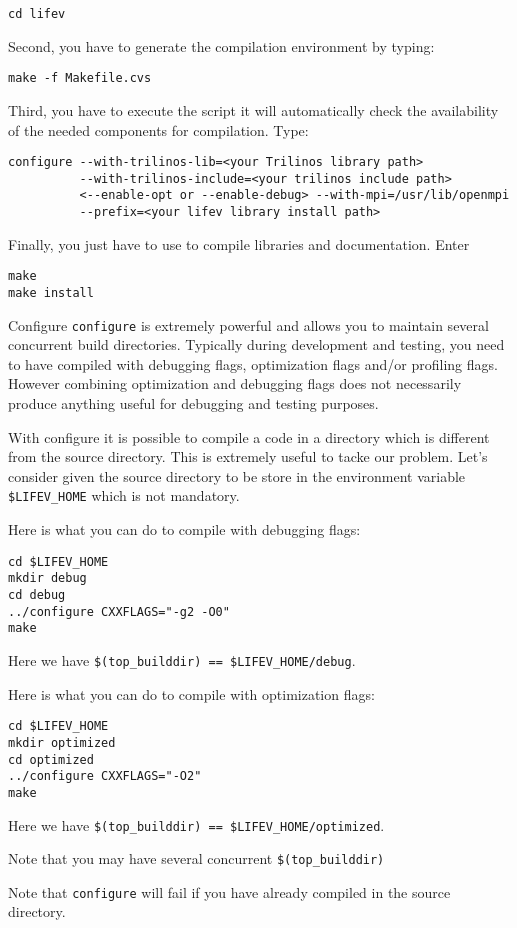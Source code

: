 \begin{verbatim}
cd lifev
\end{verbatim}

\noindent Second, you have to generate the compilation environment by typing:
\begin{verbatim}
make -f Makefile.cvs
\end{verbatim}

\noindent Third, you have to execute the script
it will automatically check the availability of the needed components
for \lifev compilation. Type:

\begin{verbatim}
configure --with-trilinos-lib=<your Trilinos library path>
          --with-trilinos-include=<your trilinos include path>
          <--enable-opt or --enable-debug> --with-mpi=/usr/lib/openmpi
          --prefix=<your lifev library install path>
\end{verbatim}

\noindent Finally, you just have to use  to compile \lifev libraries and documentation.
Enter
\begin{verbatim}
make
make install
\end{verbatim}

\begin{hint}{Configure}
  \label{hint:configure}
  \verb!configure! is extremely powerful and allows you to maintain
  several concurrent build directories. Typically during development
  and testing, you need to have \lifev compiled with debugging flags,
  optimization flags and/or profiling flags. However combining
  optimization and debugging flags does not necessarily produce
  anything useful for debugging and testing purposes.

  With configure it is possible to compile a code in a directory which
  is different from the source directory. This is extremely useful to
  tacke our problem. Let's consider given the source directory to be
  store in the environment variable \verb!$LIFEV_HOME! which is not
  mandatory.

Here is what you can do to compile with debugging flags:
\begin{verbatim}
cd $LIFEV_HOME
mkdir debug
cd debug
../configure CXXFLAGS="-g2 -O0"
make
\end{verbatim}
Here we have \verb+$(top_builddir) == $LIFEV_HOME/debug+.

Here is what you can do to compile with optimization flags:
\begin{verbatim}
cd $LIFEV_HOME
mkdir optimized
cd optimized
../configure CXXFLAGS="-O2"
make
\end{verbatim}
Here we have \verb+$(top_builddir) == $LIFEV_HOME/optimized+.

\noindent Note that you may have several concurrent \verb+$(top_builddir)+

\noindent Note that \verb!configure! will fail if you have already compiled
\lifev in the source directory.


\end{hint}


